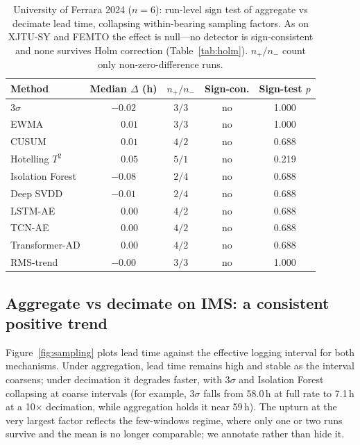 \documentclass[journal]{IEEEtran}
\begin{document}
\begin{table}[t]
\caption{University of Ferrara 2024 ($n{=}6$): run-level sign test of aggregate vs
decimate lead time, collapsing within-bearing sampling factors. As on XJTU-SY and
FEMTO the effect is null---no detector is sign-consistent and none survives Holm
correction (Table~\ref{tab:holm}). $n_{+}/n_{-}$ count only non-zero-difference runs.}
\label{tab:ferrara_paired}
\centering
\footnotesize
\setlength{\tabcolsep}{3.5pt}
\begin{tabular}{@{}lcccc@{}}
\toprule
Method & Median $\Delta$ (h) & $n_{+}/n_{-}$ & Sign-con. & Sign-test $p$ \\
\midrule
3$\sigma$        & $-0.02$           & $3/3$ & no & 1.000 \\
EWMA             & $\phantom{-}0.01$ & $3/3$ & no & 1.000 \\
CUSUM            & $\phantom{-}0.01$ & $4/2$ & no & 0.688 \\
Hotelling $T^2$  & $\phantom{-}0.05$ & $5/1$ & no & 0.219 \\
Isolation Forest & $-0.08$           & $2/4$ & no & 0.688 \\
Deep SVDD        & $-0.01$           & $2/4$ & no & 0.688 \\
LSTM-AE          & $\phantom{-}0.00$ & $4/2$ & no & 0.688 \\
TCN-AE           & $\phantom{-}0.00$ & $4/2$ & no & 0.688 \\
Transformer-AD   & $\phantom{-}0.00$ & $4/2$ & no & 0.688 \\
RMS-trend        & $-0.00$           & $3/3$ & no & 1.000 \\
\bottomrule
\end{tabular}
\end{table}

\subsection{Aggregate vs decimate on IMS: a consistent positive trend}
Figure~\ref{fig:sampling} plots lead time against the effective logging interval
for both mechanisms. Under aggregation, lead time remains high and stable as the
interval coarsens; under decimation it degrades faster, with 3$\sigma$ and
Isolation Forest collapsing at coarse intervals (for example, 3$\sigma$ falls
from 58.0\,h at full rate to 7.1\,h at a 10$\times$ decimation, while
aggregation holds it near 59\,h). The upturn at the very largest factor reflects
the few-windows regime, where only one or two runs survive and the mean is no
longer comparable; we annotate rather than hide it.
\end{document}
